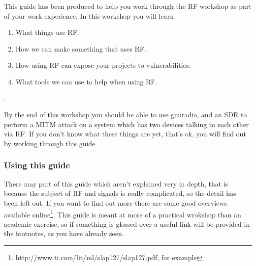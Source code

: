 This guide has been produced to help you work through the RF workshop as part of your work experience. In this workshop you will learn \begin{enumerate}\item What things use RF. \item How we can make something that uses RF. \item How using RF can expose your projects to vulnerabilities. \item What tools we can use to help when using RF. \end{enumerate}.

By the end of this workshop you should be able to use gnuradio, and an SDR to perform a MITM attack on a system which has two devices talking to each other via RF. If you don't know what these things are yet, that's ok, you will find out by working through this guide.

\subsubsection{Using this guide}
There may part of this guide which aren't explained very in depth, that is because the subject of RF and signals is really complicated, so the detail has been left out. If you want to find out more there are some good overviews available online\footnote{http://www.ti.com/lit/ml/slap127/slap127.pdf, for example}. This guide is meant at more of a practical wrokshop than an academic exercise, so if something is glossed over a useful link will be provided in the footnotes, as you have already seen.
